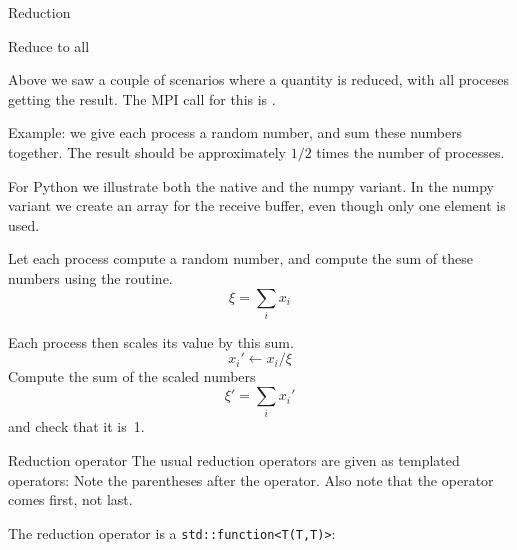 
 {Reduction}

 {Reduce to all}
\label{sec:allreduce}

Above we saw a couple of scenarios where a quantity is reduced, with
all proceses getting the result. The MPI call for this is
%
.

Example: we give each process a random number, and sum these numbers together.
The result should be approximately $1/2$ times the number of processes.


For Python we illustrate both the native and the numpy variant. In the
numpy variant we create an array for the receive buffer, even though
only one element is used.


\begin{exercise}
  \label{ex:randommaxscale}
  Let each process compute a random number,
  and compute the sum of these numbers using the 
  routine.
  \[ \xi = \sum_i x_i \]

  Each process then scales its value
  by this sum.
  \[ x_i' \leftarrow x_i/ \xi \]
  Compute the sum of the scaled numbers
  \[ \xi' = \sum_i x_i' \]
  and check that it is~1.
\end{exercise}

\begin{mplnote}{Reduction operator}
  The usual reduction operators are given as templated operators:
  Note the parentheses after the operator.
  Also note that the operator comes first, not last.
  \begin{mplimpl}
    The reduction operator is a \lstinline+std::function<T(T,T)>+:  
  \end{mplimpl}
\end{mplnote}


